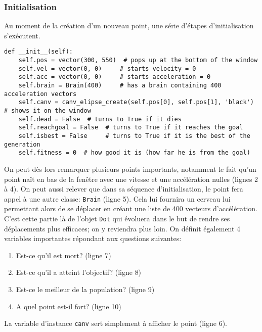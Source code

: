 \documentclass[12pt, a4paper, openany]{book}
\begin{document}
\subsubsection{Initialisation}
Au moment de la création d'un nouveau point, une série d'étapes d'initialisation s'exécutent.
\begin{verbatim}
def __init__(self):
	self.pos = vector(300, 550)	 # pops up at the bottom of the window
	self.vel = vector(0, 0)		# starts velocity = 0
	self.acc = vector(0, 0)		# starts acceleration = 0
	self.brain = Brain(400)		# has a brain containing 400 acceleration vectors
	self.canv = canv_elipse_create(self.pos[0], self.pos[1], 'black')  # shows it on the window
	self.dead = False  # turns to True if it dies
	self.reachgoal = False  # turns to True if it reaches the goal
	self.isbest = False		# turns to True if it is the best of the generation
	self.fitness = 0  # how good it is (how far he is from the goal)
\end{verbatim}
On peut dès lors remarquer plusieurs points importants, notamment le fait qu'un point \og naît\fg{} en bas de la fenêtre avec une vitesse et une accélération nulles (lignes 2 à 4). On peut aussi relever que dans sa séquence d'initialisation, le point fera appel à une autre classe: \verb'Brain' (ligne 5). Cela lui fournira un \og cerveau\fg{} lui permettant alors de se déplacer en créant une liste de 400 vecteurs d'accélération. C'est cette partie là de l'objet \verb'Dot' qui évoluera dans le but de rendre ses déplacements plus efficaces; on y reviendra plus loin. On définit également 4 variables importantes répondant aux questions suivantes:
\begin{enumerate}
	\item Est-ce qu'il est mort? (ligne 7)
	\item Est-ce qu'il a atteint l'objectif? (ligne 8)
	\item Est-ce le meilleur de la population? (ligne 9)
	\item A quel point est-il fort? (ligne 10)
\end{enumerate}
La variable d'instance \verb'canv' sert simplement à afficher le point (ligne 6).
\end{document}
